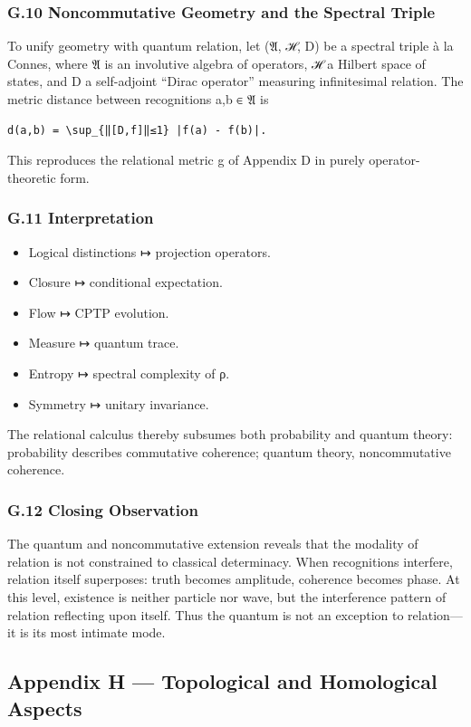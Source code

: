 \documentclass[11pt]{article}
\begin{document}
\subsubsection*{G.10 Noncommutative Geometry and the Spectral Triple}
\label{sec:org5b2c3af}
To unify geometry with quantum relation,  
let (𝔄, ℋ, D) be a spectral triple à la Connes,  
where 𝔄 is an involutive algebra of operators,  
ℋ a Hilbert space of states,  
and D a self-adjoint “Dirac operator” measuring infinitesimal relation.  
The metric distance between recognitions a,b ∈ 𝔄 is

\begin{verbatim}
d(a,b) = \sup_{‖[D,f]‖≤1} |f(a) - f(b)|.
\end{verbatim}

This reproduces the relational metric g of Appendix D  
in purely operator-theoretic form.
\subsubsection*{G.11 Interpretation}
\label{sec:org3a8b674}
\begin{itemize}
\item Logical distinctions ↦ projection operators.
\item Closure ↦ conditional expectation.
\item Flow ↦ CPTP evolution.
\item Measure ↦ quantum trace.
\item Entropy ↦ spectral complexity of ρ.
\item Symmetry ↦ unitary invariance.
\end{itemize}

The relational calculus thereby subsumes both probability and quantum theory:  
probability describes commutative coherence; quantum theory, noncommutative coherence.
\subsubsection*{G.12 Closing Observation}
\label{sec:org9addc9b}
The quantum and noncommutative extension reveals that  
the modality of relation is not constrained to classical determinacy.  
When recognitions interfere, relation itself superposes:  
truth becomes amplitude, coherence becomes phase.  
At this level, existence is neither particle nor wave,  
but the interference pattern of relation reflecting upon itself.  
Thus the quantum is not an exception to relation—it is its most intimate mode.
\subsection*{Appendix H — Topological and Homological Aspects}
\label{sec:org2c0866c}
\end{document}
